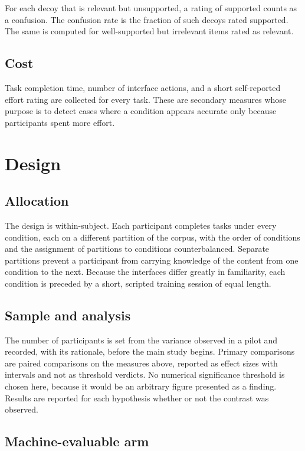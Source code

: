 \documentclass[11pt]{article}
\theoremstyle{definition}
\begin{document}
For each decoy that is relevant but unsupported, a rating of supported counts as a confusion. The confusion rate is the fraction of such decoys rated supported. The same is computed for well-supported but irrelevant items rated as relevant.

\subsection{Cost}

Task completion time, number of interface actions, and a short self-reported effort rating are collected for every task. These are secondary measures whose purpose is to detect cases where a condition appears accurate only because participants spent more effort.

\section{Design}

\subsection{Allocation}

The design is within-subject. Each participant completes tasks under every condition, each on a different partition of the corpus, with the order of conditions and the assignment of partitions to conditions counterbalanced. Separate partitions prevent a participant from carrying knowledge of the content from one condition to the next. Because the interfaces differ greatly in familiarity, each condition is preceded by a short, scripted training session of equal length.

\subsection{Sample and analysis}

The number of participants is set from the variance observed in a pilot and recorded, with its rationale, before the main study begins. Primary comparisons are paired comparisons on the measures above, reported as effect sizes with intervals and not as threshold verdicts. No numerical significance threshold is chosen here, because it would be an arbitrary figure presented as a finding. Results are reported for each hypothesis whether or not the contrast was observed.

\subsection{Machine-evaluable arm}
\end{document}
